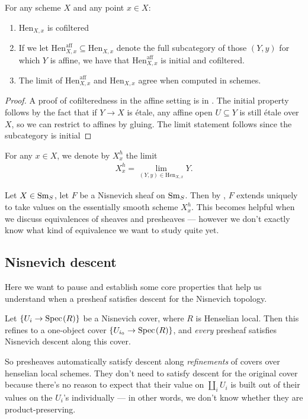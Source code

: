 \documentclass[11pt,openany]{book}
\providecommand{\Hen}{\mathrm{Hen}}
\providecommand{\aff}{\mathrm{aff}}
\begin{document}
\begin{proposition}\label{prop:HenXx-cofiltered} For any scheme $X$ and any point $x\in X$:
\begin{enumerate}
    \item $\Hen_{X,x}$ is cofiltered
    \item If we let $\Hen_{X,x}^\aff \subseteq \Hen_{X,x}$ denote the full subcategory of those $(Y,y)$ for which $Y$ is affine, we have that $\Hen_{X,x}^\aff$ is initial and cofiltered.
    \item The limit of $\Hen_{X,x}^\aff$ and $\Hen_{X,x}$ agree when computed in schemes.
\end{enumerate}
\end{proposition}
\begin{proof} A proof of cofilteredness in the affine setting is in \cite[04GV]{Stacks}. The initial property follows by the fact that if $Y \to X$ is \'etale, any affine open $U \subseteq Y$ is still \'etale over $X$, so we can restrict to affines by gluing. The limit statement follows since the subcategory is initial
\end{proof}

\begin{definition}\label{def:henselization} For any $x\in X$, we denote by $X_x^h$ the limit
\begin{align*}
    X_x^h = \lim_{(Y,y)\in \Hen_{X,x}} Y.
\end{align*}
\end{definition}

Let $X\in \mathrm{Sm}_S$, let $F$ be a Nisnevich sheaf on $\mathrm{Sm}_S$. Then by , $F$ extends uniquely to take values on the essentially smooth scheme $X_x^h$. This becomes helpful when we discuss equivalences of sheaves and presheaves --- however we don't exactly know what kind of equivalence we want to study quite yet. 

\subsection{Nisnevich descent}

Here we want to pause and establish some core properties that help us understand when a presheaf satisfies descent for the Nisnevich topology.

\begin{proposition} Let $\left\{ U_i \to \text{Spec}\hspace{0.1em}(R) \right\}$ be a Nisnevich cover, where $R$ is Henselian local. Then this refines to a one-object cover $\left\{ U_{i_0}\to \text{Spec}\hspace{0.1em}(R) \right\}$, and \emph{every} presheaf satisfies Nisnevich descent along this cover.
\end{proposition}
So presheaves automatically satisfy descent along \emph{refinements} of covers over henselian local schemes. They don't need to satisfy descent for the original cover because there's no reason to expect that their value on $\amalg_i U_i$ is built out of their values on the $U_i$'s individually --- in other words, we don't know whether they are product-preserving.
\end{document}
